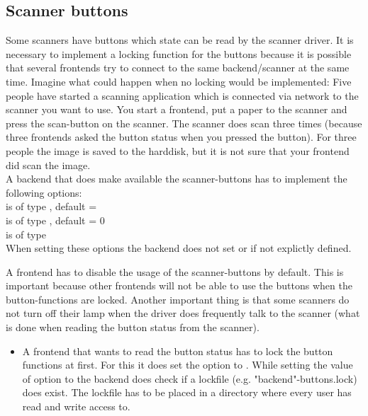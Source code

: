 \documentclass[11pt,DVIps]{report}
\begin{document}
\subsection{Scanner buttons}
\begin{changebar}
Some scanners have buttons which state can be read by the scanner driver. 
It is necessary to implement a locking function for the buttons
because it is possible that several frontends try to connect to the
same backend/scanner at the same time. Imagine what could happen
when no locking would be implemented:
Five people have started a scanning application which is connected
via network to the scanner you want to use. You start a frontend,
put a paper to the scanner and press the scan-button on the scanner.
The scanner does scan three times (because three frontends asked the
button status when you pressed the button). For three people the
image is saved to the harddisk, but it is not sure that your
frontend did scan the image.\\

A backend that does make available the scanner-buttons has to
implement the following options:\\
 is of type , default = \\
 is of type , default = 0\\
 is of type \\
When setting these options the backend does not set 
or  if not explictly defined.

A frontend has to disable the usage of the scanner-buttons by default. This is important
because other frontends will not be able to use the buttons when the button-functions are locked.
Another important thing is that some scanners do not turn off their lamp when the driver
does frequently talk to the scanner (what is done when reading the button status from the scanner).

\begin{itemize}

\item
A frontend that wants to read the button status has to lock the
button functions at first. For this it does set the option
 to .
While setting the value of option  to 
the backend does check if a lockfile (e.g. "backend"-buttons.lock) does exist.
The lockfile has to be placed in a directory where every user has read and write access to.


\end{itemize}
\end{changebar}
\end{document}
